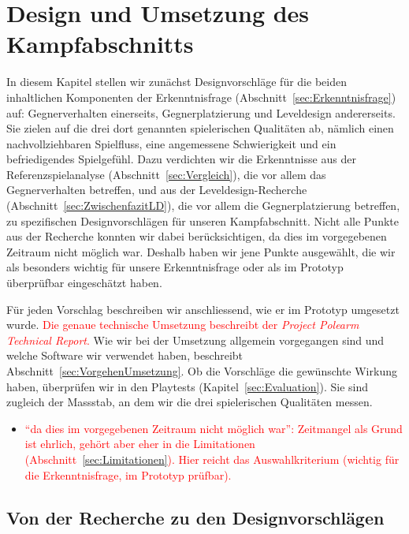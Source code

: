 \documentclass[../Main.tex]{subfiles}
\begin{document}
\section{Design und Umsetzung des Kampfabschnitts} \label{sec:Umsetzung}

In diesem Kapitel stellen wir zunächst Designvorschläge für die beiden inhaltlichen Komponenten der Erkenntnisfrage (Abschnitt~\ref{sec:Erkenntnisfrage}) auf: Gegnerverhalten einerseits, Gegnerplatzierung und Leveldesign andererseits. Sie zielen auf die drei dort genannten spielerischen Qualitäten ab, nämlich einen nachvollziehbaren Spielfluss, eine angemessene Schwierigkeit und ein befriedigendes Spielgefühl. Dazu verdichten wir die Erkenntnisse aus der Referenzspielanalyse (Abschnitt~\ref{sec:Vergleich}), die vor allem das Gegnerverhalten betreffen, und aus der Leveldesign-Recherche (Abschnitt~\ref{sec:ZwischenfazitLD}), die vor allem die Gegnerplatzierung betreffen, zu spezifischen Designvorschlägen für unseren Kampfabschnitt. Nicht alle Punkte aus der Recherche konnten wir dabei berücksichtigen, da dies im vorgegebenen Zeitraum nicht möglich war. Deshalb haben wir jene Punkte ausgewählt, die wir als besonders wichtig für unsere Erkenntnisfrage oder als im Prototyp überprüfbar eingeschätzt haben.

Für jeden Vorschlag beschreiben wir anschliessend, wie er im Prototyp umgesetzt wurde. \textcolor{red}{Die genaue technische Umsetzung beschreibt der \textit{Project Polearm Technical Report}.} Wie wir bei der Umsetzung allgemein vorgegangen sind und welche Software wir verwendet haben, beschreibt Abschnitt~\ref{sec:VorgehenUmsetzung}. Ob die Vorschläge die gewünschte Wirkung haben, überprüfen wir in den Playtests (Kapitel~\ref{sec:Evaluation}). Sie sind zugleich der Massstab, an dem wir die drei spielerischen Qualitäten messen.

\begin{itemize}[leftmargin=1.5cm]
    \item \textcolor{red}{\enquote{da dies im vorgegebenen Zeitraum nicht möglich war}: Zeitmangel als Grund ist ehrlich, gehört aber eher in die Limitationen (Abschnitt~\ref{sec:Limitationen}). Hier reicht das Auswahlkriterium (wichtig für die Erkenntnisfrage, im Prototyp prüfbar).}
\end{itemize}

\subsection{Von der Recherche zu den Designvorschlägen} \label{sec:Designvorschlaege}
\end{document}
